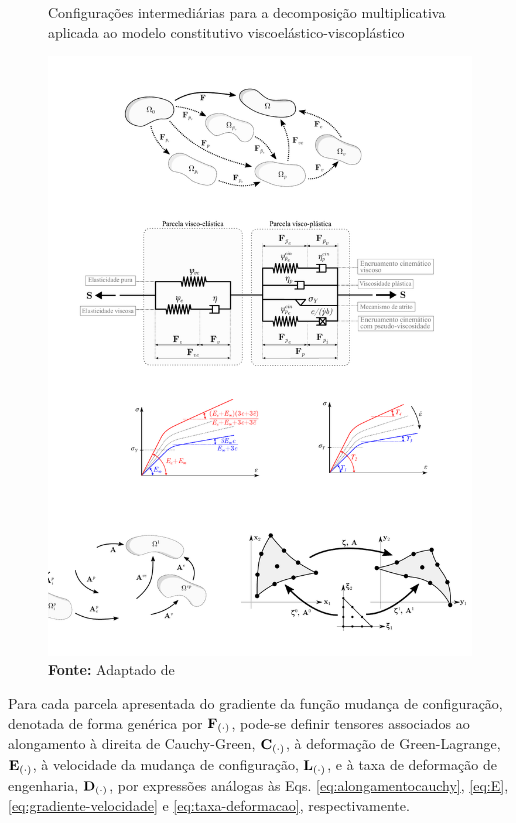 \documentclass[Tese.tex]{subfiles}
\begin{document}
\begin{figure}[!htb]
	\centering
	\caption{Configurações intermediárias para a decomposição multiplicativa aplicada ao modelo constitutivo viscoelástico-viscoplástico}
	\label{fig:kinematics-vep}
	\includegraphics[scale=1.04]{Figuras/kinematics-vep.pdf}
	\caption*{\textbf{Fonte:} Adaptado de }
\end{figure}

Para cada parcela apresentada do gradiente da função mudança de configuração, denotada de forma genérica por $\mathbf{F}_{(\cdot)}$, pode-se definir tensores associados ao alongamento à direita de Cauchy-Green, $\mathbf{C}_{(\cdot)}$, à deformação de Green-Lagrange, $\mathbf{E}_{(\cdot)}$, à velocidade da mudança de configuração, $\mathbf{L}_{(\cdot)}$, e à taxa de deformação de engenharia, $\mathbf{D}_{(\cdot)}$, por expressões análogas às Eqs. \eqref{eq:alongamentocauchy}, \eqref{eq:E}, \eqref{eq:gradiente-velocidade} e \eqref{eq:taxa-deformacao}, respectivamente. 
\end{document}
